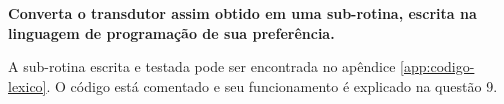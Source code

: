 
\textbf{Converta o transdutor assim obtido em uma sub-rotina, escrita na linguagem de programação de sua preferência.}

A sub-rotina escrita e testada pode ser encontrada no apêndice \ref{app:codigo-lexico}.
O código está comentado e seu funcionamento é explicado na questão 9.
